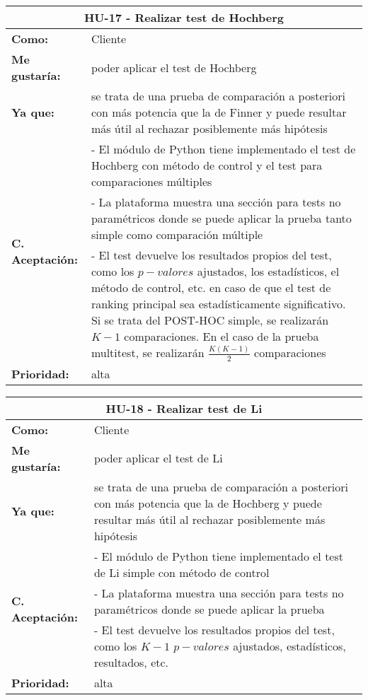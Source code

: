 \begin{table}[H]
	\begin{tabular}{| p{3cm}| p{11cm} |}
		\hline
		\multicolumn{2}{|c|}{\textbf{HU-17} - Realizar test de Hochberg} \\ \hline
		\textbf{Como:} & Cliente \\ \hline
		\textbf{Me gustaría:} & poder aplicar el test de Hochberg \\ \hline
		\textbf{Ya que:} & se trata de una prueba de comparación a posteriori con más potencia que la de Finner y puede resultar más útil al rechazar posiblemente más hipótesis \\ \hline
		\multirow{3}{11cm}{\textbf{C. Aceptación:}} & - El módulo de Python tiene implementado el test de Hochberg con método de control y el test para comparaciones múltiples \\
		& - La plataforma muestra una sección para tests no paramétricos donde se puede aplicar la prueba tanto simple como comparación múltiple \\
		& - El test devuelve los resultados propios del test, como los $p-valores$ ajustados, los estadísticos, el método de control, etc. en caso de que el test de ranking principal sea estadísticamente significativo. Si se trata del POST-HOC simple, se realizarán $K-1$ comparaciones. En el caso de la prueba multitest, se realizarán $\frac{K(K-1)}{2}$ comparaciones \\ \hline
		\textbf{\textbf{Prioridad:}} & alta \\ \hline
	\end{tabular}
\end{table}


\begin{table}[H]
	\begin{tabular}{| p{3cm}| p{11cm} |}
		\hline
		\multicolumn{2}{|c|}{\textbf{HU-18} - Realizar test de Li} \\ \hline
		\textbf{Como:} & Cliente \\ \hline
		\textbf{Me gustaría:} & poder aplicar el test de Li \\ \hline
		\textbf{Ya que:} & se trata de una prueba de comparación a posteriori con más potencia que la de Hochberg y puede resultar más útil al rechazar posiblemente más hipótesis \\ \hline
		\multirow{3}{11cm}{\textbf{C. Aceptación:}} & - El módulo de Python tiene implementado el test de Li simple con método de control \\
		& - La plataforma muestra una sección para tests no paramétricos donde se puede aplicar la prueba \\
		& - El test devuelve los resultados propios del test, como los $K-1$ $p-valores$ ajustados, estadísticos, resultados, etc. \\ \hline
		\textbf{\textbf{Prioridad:}} & alta \\ \hline
	\end{tabular}
\end{table}

